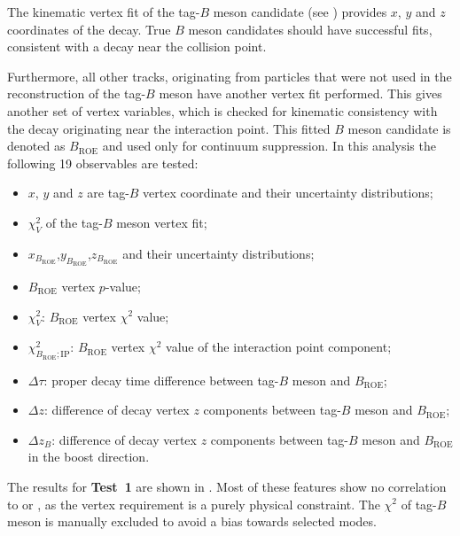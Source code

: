The kinematic vertex fit of the tag-$B$ meson candidate (see ) provides $x$, $y$ and $z$ coordinates of the decay.
True $B$ meson candidates should have successful fits, consistent with a decay near the collision point.

Furthermore, all other tracks, originating from particles that were not used in the reconstruction of the tag-$B$ meson have another vertex fit performed.
This gives another set of vertex variables, which is checked for kinematic consistency with the decay originating near the interaction point.
This fitted $B$ meson candidate is denoted as $B_{\mathrm{ROE}}$ and used only for continuum suppression.
In this analysis the following 19 observables are tested:
\begin{itemize}
    \item $x$, $y$ and $z$ are tag-$B$ vertex coordinate and their uncertainty distributions;
    \item $\chi_V^2$ of the tag-$B$ meson vertex fit;
    \item $x_{B_{\mathrm{ROE}}}$,$y_{B_{\mathrm{ROE}}}$,$z_{B_{\mathrm{ROE}}}$ and their uncertainty distributions;
    \item $B_{\mathrm{ROE}}$ vertex $p$-value;
    \item $\chi^2_{V}$: $B_{\mathrm{ROE}}$ vertex $\chi^2$ value;
    \item $\chi^2_{B_{\mathrm{ROE}};\mathrm{IP}}$: $B_{\mathrm{ROE}}$ vertex $\chi^2$ value of the interaction point component;
    \item $\Delta \tau$: proper decay time difference between tag-$B$ meson and $B_{\mathrm{ROE}}$;
    \item $\Delta z$: difference of decay vertex $z$ components between tag-$B$ meson and $B_{\mathrm{ROE}}$;
    \item $\Delta z_B$: difference of decay vertex $z$ components between tag-$B$ meson and $B_{\mathrm{ROE}}$ in the boost direction.
\end{itemize}

The results for \textbf{Test~1} are shown in .
Most of these features show no correlation to \EB or \Estar, as the vertex requirement is a purely physical constraint.
The $\chi^2$ of tag-$B$ meson is manually excluded to avoid a bias towards selected \FEI modes.

